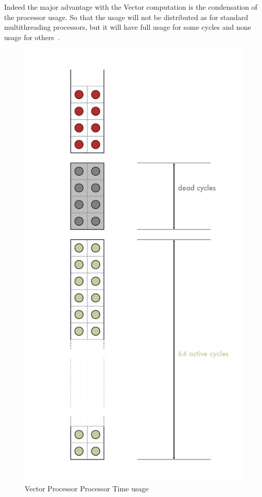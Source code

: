 Indeed the major advantage with the Vector computation is the condensation of the processor usage. 
So that the usage will not be distributed as for standard multithreading processors, but it will have full usage for some cycles and none usage for others~\cite{L15-Krste}.

\begin{figure}[H]
    \centering
    \includegraphics[scale = 0.4]{Chapter_1/img/time-usage.png}
    \caption{Vector Processor Processor Time usage \cite{L15-Krste}}
    \label{Vectoring}
\end{figure}

